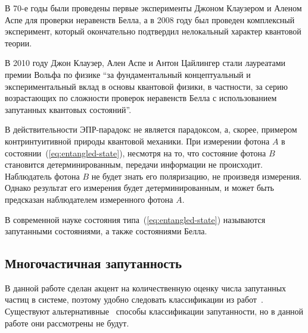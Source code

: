В 70-е годы были проведены первые эксперименты\cite{Alain1976} Джоном Клаузером и Аленом Аспе для проверки неравенств Белла,
а в 2008 году был проведен комплексный эксперимент\cite{Scheidl2010},
который окончательно подтвердил нелокальный характер квантовой теории.

В 2010 году Джон Клаузер, Ален Аспе и Антон Цайлингер стали лауреатами премии Вольфа по физике ``за фундаментальный концептуальный и экспериментальный вклад в основы квантовой физики, в частности, за серию возрастающих по сложности проверок неравенств Белла с использованием запутанных квантовых состояний''.

В действительности  ЭПР-парадокс не является парадоксом,
а, скорее, примером контринтуитивной природы квантовой механики.
При измерении фотона $A$ в состоянии~(\ref{eq:entangled-state}),
несмотря на то, что состояние фотона $B$ становится детерминированным,
передачи информации не происходит.
Наблюдатель фотона $B$ не будет знать его поляризацию,
не произведя измерения.
Однако результат его измерения будет детерминированным,
и может быть предсказан наблюдателем измеренного фотона $A$.

В современной науке состояния типа~(\ref{eq:entangled-state}) называются запутанными состояниями, а также состояниями Белла.


\subsection{Многочастичная запутанность}


В данной работе сделан акцент на количественную оценку числа запутанных частиц в системе,
поэтому удобно следовать классификации из работ~\cite{Seevinck2001, Toth2005, Bancal2009, Chen2005, Guhne2005, Guhne2006}.
Существуют альтернативные~\cite{Dur1999, Dur2000} способы классификации запутанности,
но в данной работе они рассмотрены не будут.

